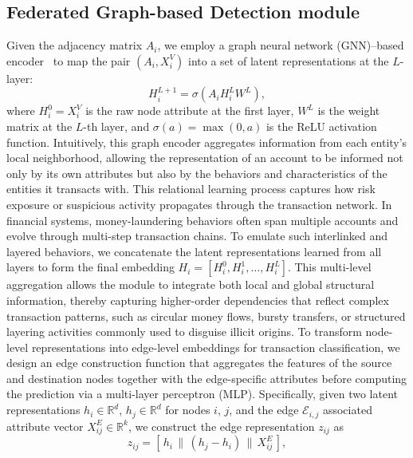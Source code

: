 \documentclass[11pt,english]{article}
\begin{document}
\subsection{Federated Graph-based Detection module}
\label{sec:detection_model}
Given the adjacency matrix $A_i$, we employ a graph neural network (GNN)–based encoder~\parencite{kipf2016semi, DBLP:conf/iclr/XuHLJ19} to map the pair $(A_i, X_i^V)$ into a set of latent representations at the $L$-layer:
\begin{equation}
    H_i^{L+1} = \sigma(A_i H_i^L W^L),
\end{equation}
where $H_i^0=X_i^V$ is the raw node attribute at the first layer, $W^L$ is the weight matrix at the $L$-th layer, and $\sigma(a)=\max(0,a)$ is the ReLU activation function. Intuitively, this graph encoder aggregates information from each entity’s local neighborhood, allowing the representation of an account to be informed not only by its own attributes but also by the behaviors and characteristics of the entities it transacts with. This relational learning process captures how risk exposure or suspicious activity propagates through the transaction network. In financial systems, money-laundering behaviors often span multiple accounts and evolve through multi-step transaction chains. To emulate such interlinked and layered behaviors, we concatenate the latent representations learned from all layers to form the final embedding $H_i = [H_i^0, H_i^1, \ldots, H_i^L]$. This multi-level aggregation allows the module to integrate both local and global structural information, thereby capturing higher-order dependencies that reflect complex transaction patterns, such as circular money flows, bursty transfers, or structured layering activities commonly used to disguise illicit origins. 
To transform node-level representations into edge-level embeddings for transaction classification, we design an edge construction function that aggregates the features of the source and destination nodes together with the edge-specific attributes before computing the prediction via a multi-layer perceptron (MLP). Specifically, given two latent representations $h_i \in \mathbb{R}^d$, $h_j \in \mathbb{R}^d$ for nodes $i$, $j$, and the edge $\mathcal{E}_{i,j}$ associated attribute vector $X^E_{ij} \in \mathbb{R}^k$, we construct the edge representation $z_{ij}$ as
\begin{equation}
    z_{ij} = \left[\, h_i \,\|\, (h_j - h_i) \,\|\, X^E_{ij} \,\right],
\end{equation}
\end{document}
